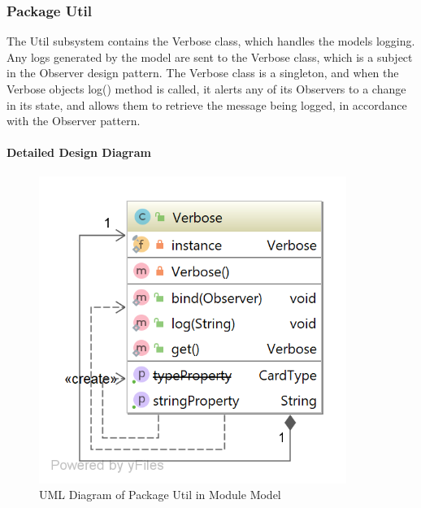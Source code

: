 \subsubsection{Package Util}

The Util subsystem contains the Verbose class, which handles the models logging. Any logs generated by the model are sent to the Verbose class, which is a subject in the Observer design pattern. The Verbose class is a singleton, and when the Verbose objects log() method is called, it alerts any of its Observers to a change in its state, and allows them to retrieve the message being logged, in accordance with the Observer pattern.

\paragraph{Detailed Design Diagram}\mbox{}
\begin{figure}[H]
\centering
\includegraphics[width=10cm]{Source/Module/Model/Util/Model_Util.png}
\caption{UML Diagram of Package Util in Module Model}
\label{Model.Util}
\end{figure}

